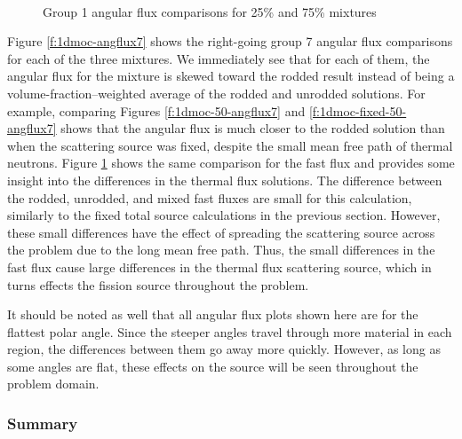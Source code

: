 \begin{figure}[H]
    \centering
    \hfill
    ~
    \caption{Group 1 angular flux comparisons for 25\% and 75\% mixtures}\label{f:1dmoc-angflux1}
\end{figure}


Figure \ref{f:1dmoc-angflux7} shows the right-going group 7 angular flux comparisons for each of the three mixtures.  We immediately see that for each of them, the angular flux for the mixture is skewed toward the rodded result instead of being a volume-fraction--weighted average of the rodded and unrodded solutions.  For example, comparing Figures \ref{f:1dmoc-50-angflux7} and \ref{f:1dmoc-fixed-50-angflux7} shows that the angular flux is much closer to the rodded solution than when the scattering source was fixed, despite the small mean free path of thermal neutrons.  Figure \ref{f:1dmoc-angflux1} shows the same comparison for the fast flux and provides some insight into the differences in the thermal flux solutions.  The difference between the rodded, unrodded, and mixed fast fluxes are small for this calculation, similarly to the fixed total source calculations in the previous section.  However, these small differences have the effect of spreading the scattering source across the problem due to the long mean free path.  Thus, the small differences in the fast flux cause large differences in the thermal flux scattering source, which in turns effects the fission source throughout the problem.

It should be noted as well that all angular flux plots shown here are for the flattest polar angle.  Since the steeper angles travel through more material in each region, the differences between them go away more quickly.  However, as long as some angles are flat, these effects on the source will be seen throughout the problem domain.

\subsubsection{Summary}

